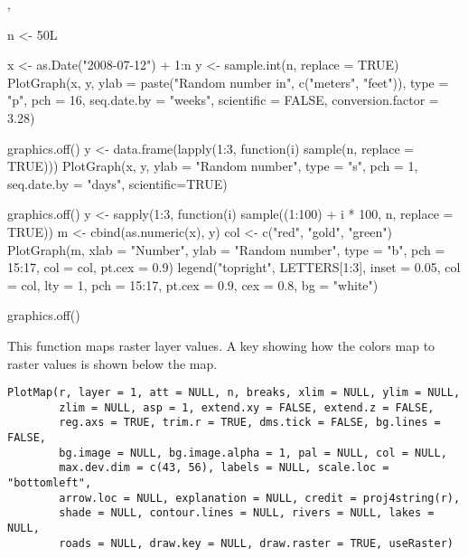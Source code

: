 \documentclass[a4paper]{book}
\begin{document}
%
\begin{SeeAlso}\relax
{}, 
\end{SeeAlso}
%
\begin{Examples}
\begin{ExampleCode}
n <- 50L

x <- as.Date("2008-07-12") + 1:n
y <- sample.int(n, replace = TRUE)
PlotGraph(x, y, ylab = paste("Random number in", c("meters", "feet")), type = "p",
          pch = 16, seq.date.by = "weeks", scientific = FALSE, conversion.factor = 3.28)

graphics.off()
y <- data.frame(lapply(1:3, function(i) sample(n, replace = TRUE)))
PlotGraph(x, y, ylab = "Random number", type = "s", pch = 1, seq.date.by = "days",
          scientific=TRUE)

graphics.off()
y <- sapply(1:3, function(i) sample((1:100) + i * 100, n, replace = TRUE))
m <- cbind(as.numeric(x), y)
col <- c("red", "gold", "green")
PlotGraph(m, xlab = "Number", ylab = "Random number", type = "b", pch = 15:17,
          col = col, pt.cex = 0.9)
legend("topright", LETTERS[1:3], inset = 0.05, col = col, lty = 1, pch = 15:17,
       pt.cex = 0.9, cex = 0.8, bg = "white")

graphics.off()
\end{ExampleCode}
\end{Examples}
%
\begin{Description}\relax
This function maps raster layer values. A key showing how the colors map to raster values is shown below the map.
\end{Description}
%
\begin{Usage}
\begin{verbatim}
PlotMap(r, layer = 1, att = NULL, n, breaks, xlim = NULL, ylim = NULL,
        zlim = NULL, asp = 1, extend.xy = FALSE, extend.z = FALSE,
        reg.axs = TRUE, trim.r = TRUE, dms.tick = FALSE, bg.lines = FALSE,
        bg.image = NULL, bg.image.alpha = 1, pal = NULL, col = NULL,
        max.dev.dim = c(43, 56), labels = NULL, scale.loc = "bottomleft",
        arrow.loc = NULL, explanation = NULL, credit = proj4string(r),
        shade = NULL, contour.lines = NULL, rivers = NULL, lakes = NULL,
        roads = NULL, draw.key = NULL, draw.raster = TRUE, useRaster)
\end{verbatim}
\end{Usage}
%
\end{document}
